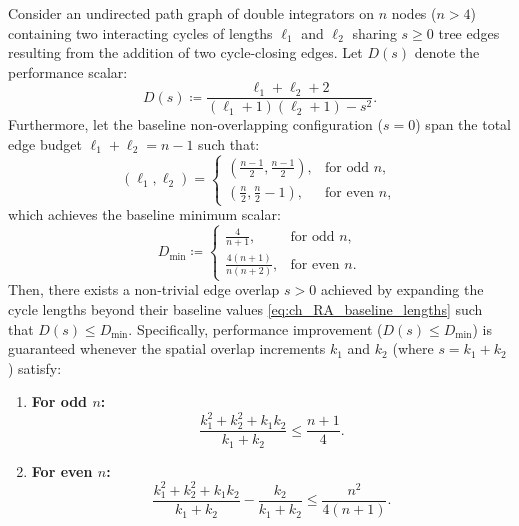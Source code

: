 \begin{theo}\label{overlap}
Consider an undirected path graph of double integrators on $n$ nodes ($n > 4$) containing two interacting cycles of lengths $\ell_1$ and $\ell_2$ sharing $s \ge 0$ tree edges resulting from the addition of two cycle-closing edges. Let $D(s)$ denote the performance scalar:
\begin{equation}\label{eq:ch_RA_Ds_def}
	D(s) \coloneqq \frac{\ell_1 + \ell_2 + 2}{(\ell_1+1)(\ell_2+1) - s^2}.
\end{equation}
Furthermore, let the baseline non-overlapping configuration ($s = 0$) span the total edge budget $\ell_1 + \ell_2 = n-1$ such that:
\begin{equation}\label{eq:ch_RA_baseline_lengths}
	(\ell_1, \ell_2) = \begin{cases} \left(\frac{n-1}{2}, \frac{n-1}{2}\right), & \text{for odd } n, \\[6pt] \left(\frac{n}{2}, \frac{n}{2}-1\right), & \text{for even } n, \end{cases}
\end{equation}
which achieves the baseline minimum scalar:
\begin{equation}
	D_{\min} \coloneqq \begin{cases} \frac{4}{n+1}, & \text{for odd } n, \\[6pt] \frac{4(n+1)}{n(n+2)}, & \text{for even } n. \end{cases}
\end{equation}
Then, there exists a non-trivial edge overlap $s > 0$ achieved by expanding the cycle lengths beyond their baseline values \eqref{eq:ch_RA_baseline_lengths} such that $D(s) \le D_{\min}$. Specifically, performance improvement ($D(s) \le D_{\min}$) is guaranteed whenever the spatial overlap increments $k_1$ and $k_2$ (where $s = k_1 + k_2$) satisfy:
\begin{enumerate}
	\item \textbf{For odd $n$:}
	\begin{equation}\label{odd_minD}
		\frac{k_1^2 + k_2^2 + k_1 k_2}{k_1 + k_2} \le \frac{n+1}{4}.
	\end{equation}
	\item \textbf{For even $n$:}
	\begin{equation}\label{even_minD}
		\frac{k_1^2 + k_2^2 + k_1 k_2}{k_1 + k_2} - \frac{k_2}{k_1 + k_2} \le \frac{n^2}{4(n+1)}.
	\end{equation}
\end{enumerate}
\end{theo}
